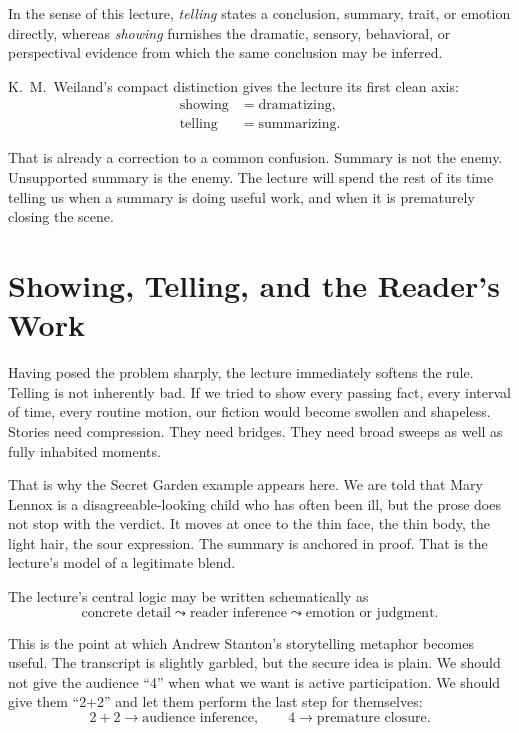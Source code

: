 \begin{definition}
In the sense of this lecture, \emph{telling} states a conclusion, summary, trait, or emotion directly, whereas \emph{showing} furnishes the dramatic, sensory, behavioral, or perspectival evidence from which the same conclusion may be inferred.
\end{definition}

K.\ M.\ Weiland's compact distinction gives the lecture its first clean axis:
\begin{align}
\text{showing} &= \text{dramatizing},\\
\text{telling} &= \text{summarizing}.
\end{align}

That is already a correction to a common confusion. Summary is not the enemy. Unsupported summary is the enemy. The lecture will spend the rest of its time telling us when a summary is doing useful work, and when it is prematurely closing the scene.

\section{Showing, Telling, and the Reader's Work}

Having posed the problem sharply, the lecture immediately softens the rule. Telling is not inherently bad. If we tried to show every passing fact, every interval of time, every routine motion, our fiction would become swollen and shapeless. Stories need compression. They need bridges. They need broad sweeps as well as fully inhabited moments.

That is why the Secret Garden example appears here. We are told that Mary Lennox is a disagreeable-looking child who has often been ill, but the prose does not stop with the verdict. It moves at once to the thin face, the thin body, the light hair, the sour expression. The summary is anchored in proof. That is the lecture's model of a legitimate blend.

The lecture's central logic may be written schematically as
\begin{equation}
\text{concrete detail} \leadsto \text{reader inference} \leadsto \text{emotion or judgment}.
\end{equation}

This is the point at which Andrew Stanton's storytelling metaphor becomes useful. The transcript is slightly garbled, but the secure idea is plain. We should not give the audience ``4'' when what we want is active participation. We should give them ``2+2'' and let them perform the last step for themselves:
\begin{equation}
2+2 \to \text{audience inference}, \qquad 4 \to \text{premature closure}.
\end{equation}


